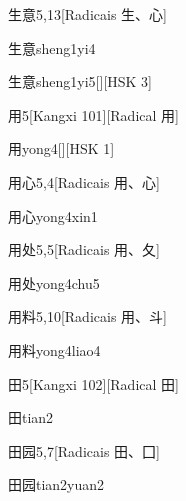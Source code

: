 \begin{entry}{生意}{5,13}[Radicais ⽣、⼼]
  \begin{phonetics}{生意}{sheng1yi4}
  \end{phonetics}
  \begin{phonetics}{生意}{sheng1yi5}[][HSK 3]
  \end{phonetics}
\end{entry}

\begin{entry}{用}{5}[Kangxi 101][Radical ⽤]
  \begin{phonetics}{用}{yong4}[][HSK 1]
  \end{phonetics}
\end{entry}

\begin{entry}{用心}{5,4}[Radicais ⽤、⼼]
  \begin{phonetics}{用心}{yong4xin1}
  \end{phonetics}
\end{entry}

\begin{entry}{用处}{5,5}[Radicais ⽤、⼡]
  \begin{phonetics}{用处}{yong4chu5}
  \end{phonetics}
\end{entry}

\begin{entry}{用料}{5,10}[Radicais ⽤、⽃]
  \begin{phonetics}{用料}{yong4liao4}
  \end{phonetics}
\end{entry}

\begin{entry}{田}{5}[Kangxi 102][Radical ⽥]
  \begin{phonetics}{田}{tian2}
  \end{phonetics}
\end{entry}

\begin{entry}{田园}{5,7}[Radicais ⽥、⼞]
  \begin{phonetics}{田园}{tian2yuan2}
  \end{phonetics}
\end{entry}

